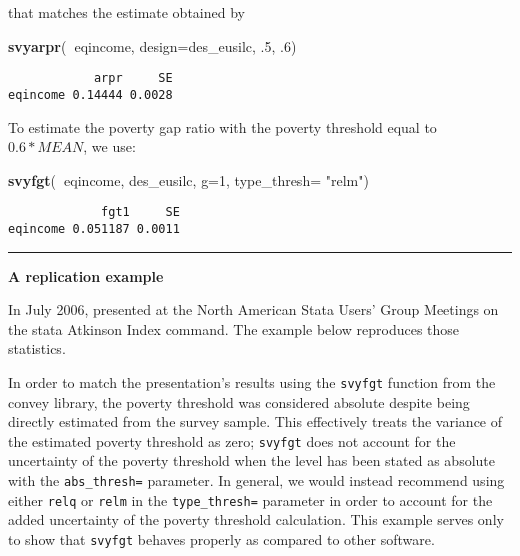 \documentclass[]{book}
\newenvironment{Shaded}{\begin{snugshade}}{\end{snugshade}}
\newcommand{\DataTypeTok}[1]{\textcolor[rgb]{0.13,0.29,0.53}{#1}}
\newcommand{\DecValTok}[1]{\textcolor[rgb]{0.00,0.00,0.81}{#1}}
\newcommand{\FloatTok}[1]{\textcolor[rgb]{0.00,0.00,0.81}{#1}}
\newcommand{\KeywordTok}[1]{\textcolor[rgb]{0.13,0.29,0.53}{\textbf{#1}}}
\newcommand{\NormalTok}[1]{#1}
\newcommand{\OperatorTok}[1]{\textcolor[rgb]{0.81,0.36,0.00}{\textbf{#1}}}
\newcommand{\StringTok}[1]{\textcolor[rgb]{0.31,0.60,0.02}{#1}}
\begin{document}
that matches the estimate obtained by

\begin{Shaded}
\begin{Highlighting}[]
\KeywordTok{svyarpr}\NormalTok{(}\OperatorTok{~}\NormalTok{eqincome, }\DataTypeTok{design=}\NormalTok{des_eusilc, }\FloatTok{.5}\NormalTok{, }\FloatTok{.6}\NormalTok{)}
\end{Highlighting}
\end{Shaded}

\begin{verbatim}
            arpr     SE
eqincome 0.14444 0.0028
\end{verbatim}

To estimate the poverty gap ratio with the poverty threshold equal to \(0.6*MEAN\), we use:

\begin{Shaded}
\begin{Highlighting}[]
\KeywordTok{svyfgt}\NormalTok{(}\OperatorTok{~}\NormalTok{eqincome, des_eusilc, }\DataTypeTok{g=}\DecValTok{1}\NormalTok{, }\DataTypeTok{type_thresh=} \StringTok{"relm"}\NormalTok{)}
\end{Highlighting}
\end{Shaded}

\begin{verbatim}
             fgt1     SE
eqincome 0.051187 0.0011
\end{verbatim}

\begin{center}\rule{0.5\linewidth}{0.5pt}\end{center}

\textbf{A replication example}

In July 2006, \citet{jenkins2006} presented at the North American Stata Users' Group Meetings on the stata Atkinson Index command. The example below reproduces those statistics.

In order to match the presentation's results using the \texttt{svyfgt} function from the convey library, the poverty threshold was considered absolute despite being directly estimated from the survey sample. This effectively treats the variance of the estimated poverty threshold as zero; \texttt{svyfgt} does not account for the uncertainty of the poverty threshold when the level has been stated as absolute with the \texttt{abs\_thresh=} parameter. In general, we would instead recommend using either \texttt{relq} or \texttt{relm} in the \texttt{type\_thresh=} parameter in order to account for the added uncertainty of the poverty threshold calculation. This example serves only to show that \texttt{svyfgt} behaves properly as compared to other software.
\end{document}
